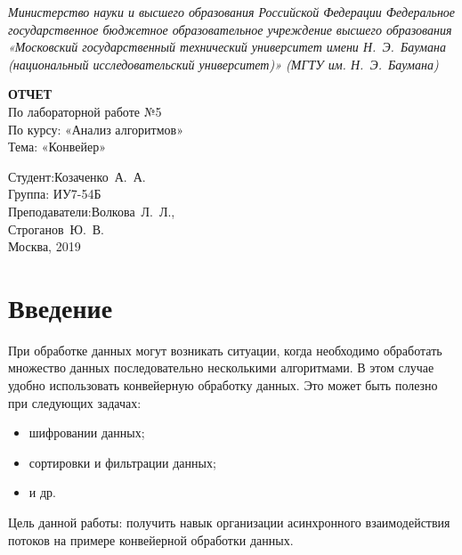 \documentclass[a4paper,14pt]{extreport}
\begin{document}
\begin{titlepage}
	\centering
	
	{\footnotesize\itshape Министерство науки и высшего образования
		Российской Федерации Федеральное государственное бюджетное
		образовательное учреждение высшего образования «Московский
		государственный технический университет имени Н.~Э.~Баумана
		(национальный исследовательский университет)» (МГТУ им. Н.~Э.~Баумана)
		\\}
	
	\vspace{60mm}
	
	\textbf{ОТЧЕТ}\\
	По лабораторной работе №5\\
	По курсу: «Анализ алгоритмов»\\
	Тема: «Конвейер»\\
	
	\vspace{60mm}
	
	\hspace{70mm} Студент:\hfill Козаченко~А.~А.\\
	\hspace{70mm} Группа: \hfill ИУ7-54Б\\
	\hspace{70mm} Преподаватели:\hfill Волкова~Л.~Л.,\\
	\hfill Строганов~Ю.~В.\\
	
	\vfill
	Москва, 2019
\end{titlepage}

\tableofcontents

\chapter*{Введение}

При обработке данных могут возникать ситуации, когда необходимо обработать множество данных последовательно несколькими алгоритмами. В этом случае удобно использовать конвейерную обработку данных. Это может быть полезно при следующих задачах:
\begin{itemize}
	\item шифровании данных;
	\item сортировки и фильтрации данных;
	\item и др.
\end{itemize}

Цель данной работы: получить навык организации асинхронного взаимодействия потоков на примере конвейерной обработки данных.
\end{document}
